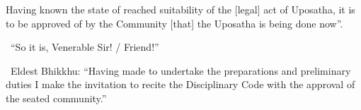 Having known the state of reached suitability of the [legal] act of Uposatha, it is to be approved of by the Community [that] the Uposatha is being done now''.

\begin{center}
  \anglebracketleft\ \hspace{-0.5mm}``So it is, Venerable Sir! / Friend!'' \hspace{-0.5mm}\anglebracketright\
\end{center}

\begin{center}
  \anglebracketleft\ \hspace{-0.5mm}Eldest Bhikkhu: ``Having made to undertake the preparations and preliminary duties I make the invitation to recite the Disciplinary Code with the approval of the seated community.'' \hspace{-0.5mm}\anglebracketright\
\end{center}

\clearpage
